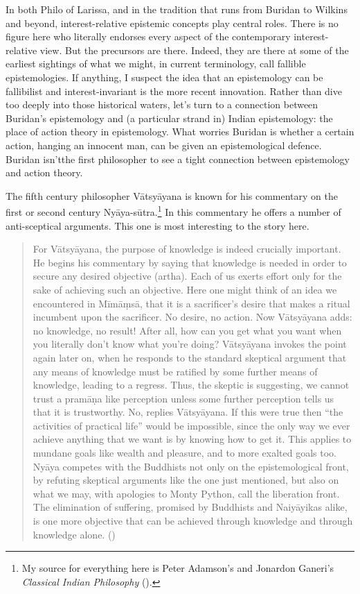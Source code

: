 \documentclass[
  10pt,
  letterpaper,
  twoside]{scrbook}
\begin{document}
In both Philo of Larissa, and in the tradition that runs from Buridan to
Wilkins and beyond, interest-relative epistemic concepts play central
roles. There is no figure here who literally endorses every aspect of
the contemporary interest-relative view. But the precursors are there.
Indeed, they are there at some of the earliest sightings of what we
might, in current terminology, call fallible epistemologies. If
anything, I suspect the idea that an epistemology can be fallibilist and
interest-invariant is the more recent innovation. Rather than dive too
deeply into those historical waters, let's turn to a connection between
Buridan's epistemology and (a particular strand in) Indian epistemology:
the place of action theory in epistemology. What worries Buridan is
whether a certain action, hanging an innocent man, can be given an
epistemological defence. Buridan isn'tthe first philosopher to see a
tight connection between epistemology and action theory.

The fifth century philosopher Vātsyāyana is known for his commentary on
the first or second century Nyāya-sūtra.\footnote{My source for
  everything here is Peter Adamson's and Jonardon Ganeri's
  \emph{Classical Indian Philosophy}
  ().} In this
commentary he offers a number of anti-sceptical arguments. This one is
most interesting to the story here.

\begin{quote}
For Vātsyāyana, the purpose of knowledge is indeed crucially important.
He begins his commentary by saying that knowledge is needed in order to
secure any desired objective (artha). Each of us exerts effort only for
the sake of achieving such an objective. Here one might think of an idea
we encountered in Mīmāṃsā, that it is a sacrificer's desire that makes a
ritual incumbent upon the sacrificer. No desire, no action. Now
Vātsyāyana adds: no knowledge, no result! After all, how can you get
what you want when you literally don't know what you're doing?
Vātsyāyana invokes the point again later on, when he responds to the
standard skeptical argument that any means of knowledge must be ratified
by some further means of knowledge, leading to a regress. Thus, the
skeptic is suggesting, we cannot trust a pramāṇa like perception unless
some further perception tells us that it is trustworthy. No, replies
Vātsyāyana. If this were true then ``the activities of practical life''
would be impossible, since the only way we ever achieve anything that we
want is by knowing how to get it. This applies to mundane goals like
wealth and pleasure, and to more exalted goals too. Nyāya competes with
the Buddhists not only on the epistemological front, by refuting
skeptical arguments like the one just mentioned, but also on what we
may, with apologies to Monty Python, call the liberation front. The
elimination of suffering, promised by Buddhists and Naiyāyikas alike, is
one more objective that can be achieved through knowledge and through
knowledge alone. ()
\end{quote}
\end{document}
